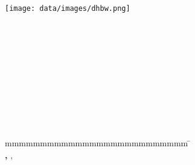 
\begin{titlepage}
	\begin{center}
	    \texttt{[image: data/images/dhbw.png]}	    
	\end{center}

	\enlargethispage{20mm}
	\begin{center}
		\vspace*{12mm}	{\LARGE\textbf \titel }\\
		\vspace*{12mm}	{\large\textbf \arbeit}\\
		\vspace*{12mm}	\langdeckblattabschlusshinleitung\\
		\vspace*{3mm}		{\textbf \abschluss}\\
		\vspace*{12mm}	\langartikelstudiengang{} \langstudiengang{} \studiengang\\
		\vspace*{3mm}		\langanderdh{} \dhbw\\
		\vspace*{12mm}	\langvon\\
		\vspace*{3mm}		{\large\textbf \autor}\\
		\vspace*{12mm}	\datumAbgabe\\
		\vspace*{12mm}
	\end{center}
	\vfill
	\begin{spacing}{1.2}
		\begin{tabbing}
			mmmmmmmmmmmmmmmmmmmmmmmmmm             \= \kill
			\textbf{\langdbbearbeitungszeit}       \>  \zeitraum\\
			\textbf{\langdbmatriknr, \langdbkurs}  \>  \martrikelnr, \kurs\\
			\textbf{\langdbbetreuer}               \>  \betreuer\\
		\end{tabbing}
	\end{spacing}
\end{titlepage}
